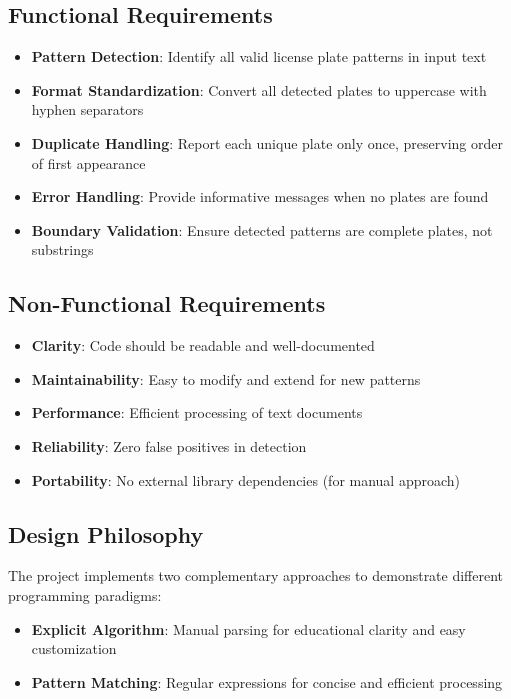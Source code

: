 \documentclass[12pt,a4paper]{article}
\begin{document}
\subsection{Functional Requirements}
\begin{itemize}
    \item \textbf{Pattern Detection}: Identify all valid license plate patterns in input text
    \item \textbf{Format Standardization}: Convert all detected plates to uppercase with hyphen separators
    \item \textbf{Duplicate Handling}: Report each unique plate only once, preserving order of first appearance
    \item \textbf{Error Handling}: Provide informative messages when no plates are found
    \item \textbf{Boundary Validation}: Ensure detected patterns are complete plates, not substrings
\end{itemize}

\subsection{Non-Functional Requirements}
\begin{itemize}
    \item \textbf{Clarity}: Code should be readable and well-documented
    \item \textbf{Maintainability}: Easy to modify and extend for new patterns
    \item \textbf{Performance}: Efficient processing of text documents
    \item \textbf{Reliability}: Zero false positives in detection
    \item \textbf{Portability}: No external library dependencies (for manual approach)
\end{itemize}

\subsection{Design Philosophy}
The project implements two complementary approaches to demonstrate different programming paradigms:
\begin{itemize}
    \item \textbf{Explicit Algorithm}: Manual parsing for educational clarity and easy customization
    \item \textbf{Pattern Matching}: Regular expressions for concise and efficient processing
\end{itemize}
\end{document}
